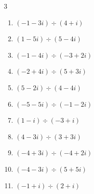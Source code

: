 \begin{multicols}{3}
\begin{enumerate}

  \item $\displaystyle (-1-3i)\div(4+i)$


  \item $\displaystyle (1-5i)\div(5-4i)$


  \item $\displaystyle (-1-4i)\div(-3+2i)$


  \item $\displaystyle (-2+4i)\div(5+3i)$


\columnbreak %

  \item $\displaystyle (5-2i)\div(4-4i)$


  \item $\displaystyle (-5-5i)\div(-1-2i)$

        \phantom{$\displaystyle =3-i$}

  \item $\displaystyle (1-i)\div(-3+i)$


  \item $\displaystyle (4-3i)\div(3+3i)$


  \item $\displaystyle (-4+3i)\div(-4+2i)$


  \item $\displaystyle (-4-3i)\div(5+5i)$


  \item $\displaystyle (-1+i)\div(2+i)$



\end{enumerate}
\end{multicols}

